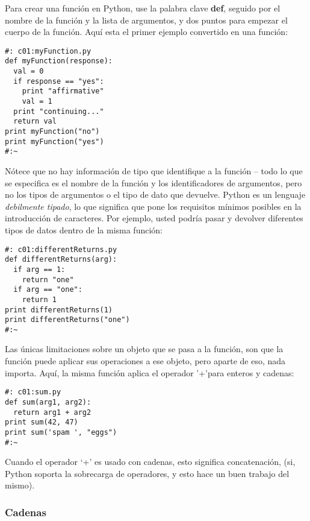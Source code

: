 Para crear una función en Python, use la palabra clave \textbf{def}, seguido por el nombre de la función y la lista de argumentos, y dos puntos para empezar el cuerpo de la función. Aquí esta el primer ejemplo convertido en una función: \newline
 
\begin{lstlisting} 
#: c01:myFunction.py 
def myFunction(response): 
  val = 0 
  if response == "yes": 
    print "affirmative" 
    val = 1 
  print "continuing..." 
  return val 
print myFunction("no") 
print myFunction("yes") 
#:~ 
\end{lstlisting}

Nótece que no hay información de tipo que identifique a la función %
– todo lo que se especifica es el nombre de la función y los identificadores de argumentos, pero no los tipos de argumentos o el tipo de dato que devuelve. Python es un lenguaje \textit{debilmente tipado},
lo que significa que pone los requisitos mínimos posibles en la introducción de caracteres. Por ejemplo, usted podría pasar y devolver diferentes tipos de datos dentro de la misma función:
\newpage

\begin{lstlisting}
#: c01:differentReturns.py 
def differentReturns(arg): 
  if arg == 1: 
    return "one" 
  if arg == "one": 
    return 1 
print differentReturns(1) 
print differentReturns("one") 
#:~ 
\end{lstlisting}

Las únicas limitaciones sobre un objeto que se pasa a la función, son que la función puede aplicar sus operaciones a ese objeto, pero aparte de eso, nada importa. Aquí, la misma función aplica el operador '+'para enteros y cadenas: \newline

\begin{lstlisting}
#: c01:sum.py 
def sum(arg1, arg2): 
  return arg1 + arg2 
print sum(42, 47) 
print sum('spam ', "eggs") 
#:~ 
 \end{lstlisting}

Cuando el operador ‘+’ es usado con cadenas, esto significa concatenación, (si, Python soporta la sobrecarga de operadores, y esto hace un buen trabajo del mismo).\newline

\subsubsection*{Cadenas}
\label{subsubsec:strings}


